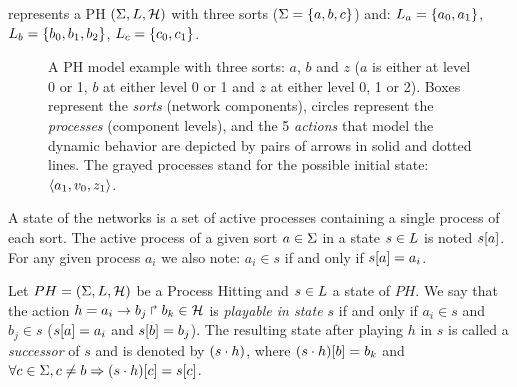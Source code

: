 
\begin{example*}
 represents a PH $(\Sigma,L,\mathcal{H})$ with three sorts
($\Sigma = \{a, b, c\}$) and:
$L_a = \{a_0, a_1\}$,
$L_b = \{b_0, b_1, b_2\}$,
$L_c = \{c_0, c_1\}$.
\begin{figure}[ht]
\centering
{}
\caption{\label{fig:ph} 
A PH model example with three sorts: $a$, $b$ and $z$ ($a$ is either at level 0 or 1, $b$ at either level 0 or 1 and $z$ at either level 0, 1 or 2). Boxes represent the \emph{sorts} (network components), circles represent the \emph{processes} (component levels), and the 5 \emph{actions} that model the dynamic behavior are depicted by pairs of arrows in solid and dotted lines. The grayed processes stand for the possible initial state: $\langle a_1, v_0, z_1 \rangle$.
}
\end{figure}
\end{example*}
A state of the networks is a set of active processes containing a single process of each sort.
The active process of a given sort $a \in \Sigma$ in a state $s \in L$
is noted ${s[a]}$.
For any given process $a_i$ we also note: $a_i \in s$ if and only if ${s[a]} = a_i$.

\begin{definition} 
\label{def:playableAction}
Let $PH = (\Sigma,L,\mathcal{H})$ be a Process Hitting and $s \in L$ a state of $PH$.
We say that the action $h = a_i\rightarrow b_j\Rsh b_k \in \mathcal{H}$
is \emph{playable in state $s$} if and only if
$a_i \in s$ and $b_j \in s$ (\ie ${s[a]} = a_i$ and ${s[b]}=b_j$).
The resulting state after playing $h$ in $s$
is called a \emph{successor} of $s$ and
is denoted by $(s \cdot h)$,
where ${(s \cdot h)[b]} = b_k$ and
$\forall c \in \Sigma, c \neq b \Rightarrow {(s \cdot h)[c]}={s[c]}$.
\end{definition}

